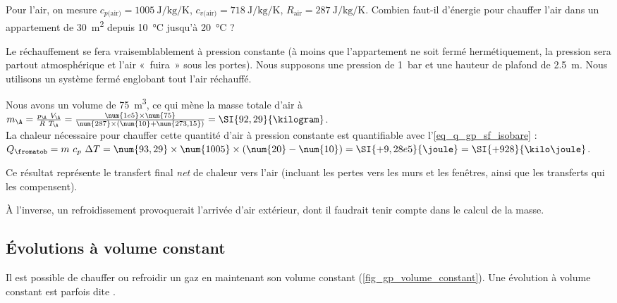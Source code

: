 		\begin{anexample}
			Pour l’air, on mesure $c_{p\text{(air)}} = \SI{1005}{\joule\per\kilogram\per\kelvin}$, $c_{v\text{(air)}} = \SI{718}{\joule\per\kilogram\per\kelvin}$, $R_\text{air} = \SI{287}{\joule\per\kilogram\per\kelvin}$.
			Combien faut-il d’énergie pour chauffer l’air dans un appartement de \SI{30}{\metre\squared} depuis \SI{10}{\degreeCelsius} jusqu’à \SI{20}{\degreeCelsius} ?
				\begin{answer}
					Le réchauffement se fera vraisemblablement à pression constante (à moins que l’appartement ne soit fermé hermétiquement, la pression sera partout atmosphérique et l’air «~fuira~» sous les portes). Nous supposons une pression de \SI{1}{\bar} et une hauteur de plafond de \SI{2,5}{\metre}. Nous utilisons un système fermé englobant tout l’air réchauffé.
					
					Nous avons un volume de \SI{75}{\metre\cubed}, ce qui mène la masse totale d’air à $m_\A = \frac{p_\A \ V_\A}{R \ T_\A} = \frac{\num{1e5} \times \num{75}}{\num{287} \times (\num{10} + \num{273,15})} = \SI{92,29}{\kilogram}$.\\
					La chaleur nécessaire pour chauffer cette quantité d’air à pression constante est quantifiable avec l’\cref{eq_q_gp_sf_isobare} : $Q_\fromatob = m \ c_p \ \Delta T = \num{93,29} \times \num{1005} \times (\num{20} - \num{10}) = \SI{+9,28e5}{\joule} = \SI{+928}{\kilo\joule}$.
				\end{answer}
					\begin{remark}Ce résultat représente le transfert final \emph{net} de chaleur vers l’air (incluant les pertes vers les murs et les fenêtres, ainsi que les transferts qui les compensent).\end{remark}
					\begin{remark}À l’inverse, un refroidissement provoquerait l’arrivée d’air extérieur, dont il faudrait tenir compte dans le calcul de la masse.\end{remark}
		\end{anexample}

	\subsection{Évolutions à volume constant}
	\label{ch_gp_isochores}

		Il est possible de chauffer ou refroidir un gaz en maintenant son volume constant (\cref{fig_gp_volume_constant}). Une évolution à volume constant est parfois dite .
			
